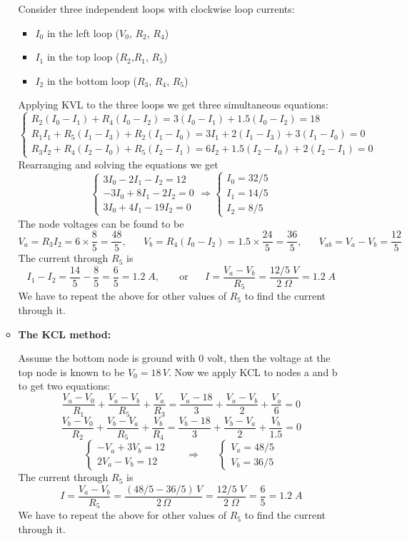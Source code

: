 \begin{itemize}
\begin{itemize}
Consider three independent loops with clockwise loop currents:
\begin{itemize}
\item $I_0$ in the left loop ($V_0$, $R_2$, $R_4$) 
\item $I_1$ in the top loop ($R_2$,$R_1$, $R_5$) 
\item $I_2$ in the bottom loop ($R_3$, $R_4$, $R_5$)
\end{itemize}
Applying KVL to the three loops we get three simultaneous equations:
\[
\left\{\begin{array}{l}
R_2(I_0-I_1)+R_4(I_0-I_2)=3(I_0-I_1)+1.5(I_0-I_2)=18\\
R_1I_1+R_5(I_1-I_3)+R_2(I_1-I_0)=3I_1+2(I_1-I_3)+3(I_1-I_0)=0\\
R_3I_2+R_4(I_2-I_0)+R_5(I_2-I_1)=6I_2+1.5(I_2-I_0)+2(I_2-I_1)
=0\end{array}\right.
\]
Rearranging and solving the equations we get
\[
\left\{\begin{array}{l}
3I_0-2I_1-I_2=12\\-3I_0+8I_1-2I_2=0\\3I_0+4I_1-19I_2=0\end{array}\right.
\Longrightarrow
\left\{\begin{array}{l}
I_0=32/5\\I_1=14/5\\I_2=8/5
\end{array}\right.
\]
The node voltages can be found to be
\[
V_a=R_3I_2=6\times \frac{8}{5}=\frac{48}{5},\;\;\;\;\;\;
V_b=R_4(I_0-I_2)=1.5\times \frac{24}{5}=\frac{36}{5},\;\;\;\;\;\;
V_{ab}=V_a-V_b=\frac{12}{5}
\]
The current through $R_5$ is
\[
I_1-I_2=\frac{14}{5}-\frac{8}{5}=\frac{6}{5}=1.2\;A,
\;\;\;\;\;\;\;\mbox{or}\;\;\;\;\;\;
I=\frac{V_a-V_b}{R_5}=\frac{12/5\;V}{2\;\Omega}=1.2\;A
\]
We have to repeat the above for other values of $R_5$ to find
the current through it.

\item {\bf The KCL method:} 

Assume the bottom node is ground with 0 volt, then the voltage at 
the top node is known to be $V_0=18\,V$. Now we apply KCL to nodes
a and b to get two equations:
\[
\frac{V_a-V_0}{R_1}+\frac{V_a-V_b}{R_5}+\frac{V_a}{R_3}
=\frac{V_a-18}{3}+\frac{V_a-V_b}{2}+\frac{V_a}{6}=0
\]
\[
\frac{V_b-V_0}{R_2}+\frac{V_b-V_a}{R_5}+\frac{V_b}{R_4}
=\frac{V_b-18}{3}+\frac{V_b-V_a}{2}+\frac{V_b}{1.5}=0
\]
\[
\left\{ \begin{array}{ll}-V_a+3V_b=12\\2V_a-V_b=12\end{array}\right.
\;\;\;\;\;\;\Longrightarrow\;\;\;\;\;\;
\left\{ \begin{array}{ll}V_a=48/5\\V_b=36/5\end{array}\right.
\]
The current through $R_5$ is
\[
I=\frac{V_a-V_b}{R_5}=\frac{(48/5-36/5)\,V}{2\,\Omega}
=\frac{12/5\;V}{2\;\Omega}=\frac{6}{5}=1.2\;A
\]
We have to repeat the above for other values of $R_5$ to find
the current through it.


\end{itemize}
\end{itemize}

